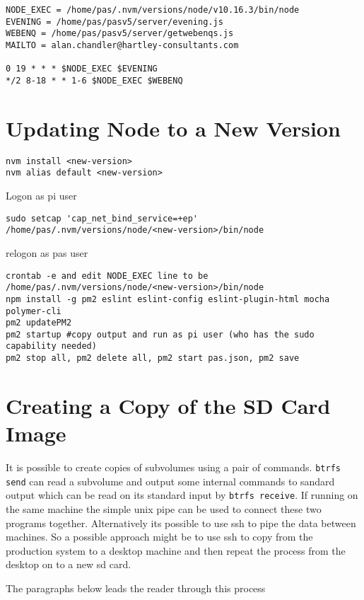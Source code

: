 \documentclass[Draft]{akc}
\begin{document}
\begin{lstlisting}
NODE_EXEC = /home/pas/.nvm/versions/node/v10.16.3/bin/node
EVENING = /home/pas/pasv5/server/evening.js
WEBENQ = /home/pas/pasv5/server/getwebenqs.js
MAILTO = alan.chandler@hartley-consultants.com

0 19 * * * $NODE_EXEC $EVENING
*/2 8-18 * * 1-6 $NODE_EXEC $WEBENQ
\end{lstlisting}
\section{Updating Node to a New Version}

\begin{lstlisting}
nvm install <new-version>
nvm alias default <new-version>
\end{lstlisting}
Logon as pi user
\begin{lstlisting}
sudo setcap 'cap_net_bind_service=+ep' /home/pas/.nvm/versions/node/<new-version>/bin/node
\end{lstlisting}
relogon as pas user
\begin{lstlisting}
crontab -e and edit NODE_EXEC line to be /home/pas/.nvm/versions/node/<new-version>/bin/node
npm install -g pm2 eslint eslint-config eslint-plugin-html mocha polymer-cli
pm2 updatePM2
pm2 startup #copy output and run as pi user (who has the sudo capability needed)
pm2 stop all, pm2 delete all, pm2 start pas.json, pm2 save
\end{lstlisting}

\section{Creating a Copy of the SD Card Image}

It is possible to create copies of subvolumes using a pair of commands.  \texttt{btrfs send} can read a subvolume
and output some internal commands to sandard output which can be read on its standard input by \texttt{btrfs receive}.
If running on the same machine the simple unix pipe can be used to connect these two programs together.  Alternatively its
possible to use ssh to pipe the data between machines.  So a possible approach might be to use ssh to copy from the production
system to a desktop machine and then repeat the process from the desktop on to a new sd card.

The paragraphs below leads the reader through this process
\end{document}
